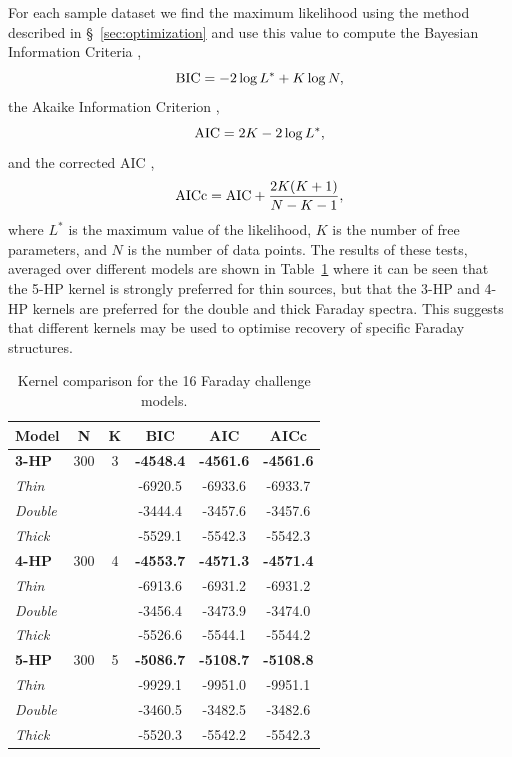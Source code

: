 \documentclass[fleqn,usenatbib]{mnras}
\begin{document}
For each sample dataset we find the maximum likelihood using the method described in \S~\ref{sec:optimization} and use this value to compute the Bayesian Information Criteria \citep[BIC;][]{1978AnSta...6..461S},
%
\begin{equation}
{\rm BIC} = -2 \log L^\ast + K \log N,
\end{equation}
%
the Akaike Information Criterion \citep[AIC;][]{AIC},
%
\begin{equation}
{\rm AIC} = 2 K - 2\log L^\ast,
\end{equation}
%
and the corrected AIC \citep[AICc;][]{AICc},
%
\begin{equation}
{\rm AICc} = {\rm AIC} + \frac{2K(K+1)}{N - K - 1},
\end{equation}
%
where $L^\ast$ is the maximum value of the likelihood, $K$ is the number of free parameters, and $N$ is the number of data points. The results of these tests, averaged over different models are shown in Table~\ref{tab:infocriteria} where it can be seen that the 5-HP kernel is strongly preferred for thin sources, but that the 3-HP and 4-HP kernels are preferred for the double and thick Faraday spectra. This suggests that different kernels may be used to optimise recovery of specific Faraday structures.
%
\begin{table}
\caption{Kernel comparison for the 16 Faraday challenge models.\label{tab:infocriteria}}
    \centering
    \begin{tabular}{l|cc|ccc}
    \hline
    Model & N & K & BIC & AIC & AICc \\\hline
    \textbf{3-HP}               & 300 & 3 & \textbf{-4548.4} & \textbf{-4561.6} & \textbf{-4561.6} \\
    {\it Thin}               & &   & -6920.5 & -6933.6 & -6933.7\\
    {\it Double}               & &   & -3444.4 & -3457.6 & -3457.6\\
    {\it Thick}               & &   & -5529.1 & -5542.3 & -5542.3 \\
    \textbf{4-HP}               & 300 & 4 & \textbf{-4553.7} & \textbf{-4571.3} & \textbf{-4571.4}\\
    {\it Thin}             & &   & -6913.6 & -6931.2& -6931.2\\
    {\it Double}             & &   & -3456.4 & -3473.9 & -3474.0\\
    {\it Thick}            & &   & -5526.6 & -5544.1 & -5544.2 \\
    \textbf{5-HP}               & 300 & 5 & \textbf{-5086.7} & \textbf{-5108.7} & \textbf{-5108.8}\\
    {\it Thin}            & &   & -9929.1 & -9951.0 & -9951.1\\
    {\it Double}              & &   & -3460.5 & -3482.5 & -3482.6\\
    {\it Thick}            & &   & -5520.3 & -5542.2 & -5542.3\\\hline
    \end{tabular}
\end{table}
\end{document}
